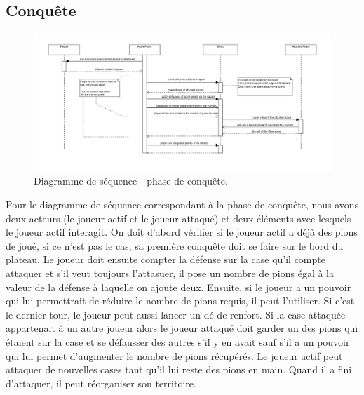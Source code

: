 \documentclass[11pt]{report}
\begin{document}
		\subsection{Conquête}
		\begin{figure}[!h]
\centering
\includegraphics[width=15cm]{Conquetesequence.png}
\caption{Diagramme de séquence - phase de conquête.}
\end{figure}
		Pour le diagramme de séquence correspondant à la phase de conquête, nous avons deux acteurs (le joueur actif et le joueur attaqué) et deux éléments avec lesquels le joueur actif interagit. On doit d'abord vérifier si le joueur actif a déjà des pions de joué, si ce n'est pas le cas, sa première conquête doit se faire sur le bord du plateau. Le joueur doit ensuite compter la défense sur la case qu'il compte attaquer et s'il veut toujours l'attasuer, il pose un nombre de pions égal à la valeur de la défense à laquelle on ajoute deux. Ensuite, si le joueur a un pouvoir qui lui permettrait  de réduire le nombre de pions requis, il peut l'utiliser. Si c'est le dernier tour, le joueur peut aussi lancer un dé de renfort. Si la case attaquée appartenait à un autre joueur alors le joueur attaqué doit garder un des pions qui étaient sur la case et se défausser des autres s'il y en avait sauf s'il a un pouvoir qui lui permet d'augmenter le nombre de pions récupérés. Le joueur actif peut attaquer de nouvelles cases tant qu'il lui reste des pions en main. Quand il a fini d'attaquer, il peut réorganiser son territoire.
\end{document}
